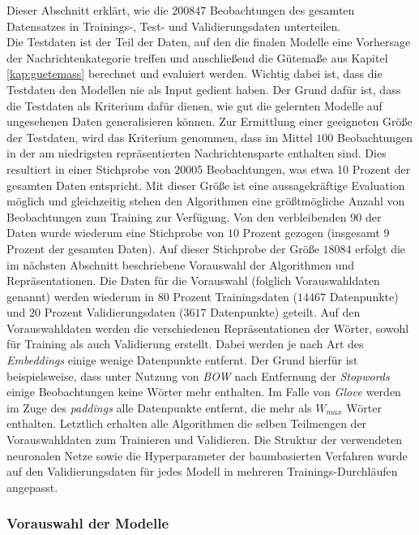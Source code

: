 \documentclass[a4paper,11pt]{article}
\begin{document}
Dieser Abschnitt erklärt, wie die $200847$ Beobachtungen des gesamten Datensatzes in Trainings-, Test- und Validierungsdaten unterteilen.\\
Die Testdaten ist der Teil der Daten, auf den die finalen Modelle eine Vorhersage der Nachrichtenkategorie treffen und anschließend die Gütemaße aus Kapitel \ref{kap:guetemass} berechnet und evaluiert werden. Wichtig dabei ist, dass die Testdaten den Modellen nie als Input gedient haben. Der Grund dafür ist, dass die Testdaten als Kriterium dafür dienen, wie gut die gelernten Modelle auf ungesehenen Daten generalisieren können. Zur Ermittlung einer geeigneten Größe der Testdaten, wird das Kriterium genommen, dass im Mittel $100$ Beobachtungen in der am niedrigsten repräsentierten Nachrichtensparte enthalten sind. Dies resultiert in einer Stichprobe von $20005$ Beobachtungen, was etwa 10 Prozent der gesamten Daten entspricht. Mit dieser Größe ist eine aussagekräftige Evaluation möglich und gleichzeitig stehen den Algorithmen eine größtmögliche Anzahl von Beobachtungen zum Training zur Verfügung. Von den verbleibenden $90$ der Daten wurde wiederum eine Stichprobe von $10$ Prozent gezogen (insgesamt $9$ Prozent der gesamten Daten). Auf dieser Stichprobe der Größe $18084$ erfolgt die im nächsten Abschnitt beschriebene Vorauswahl der Algorithmen und Repräsentationen. Die Daten für die Vorauswahl (folglich Vorauswahldaten genannt) werden wiederum in $80$ Prozent Trainingsdaten ($14467$ Datenpunkte) und $20$ Prozent  Validierungsdaten ($3617$ Datenpunkte) geteilt. Auf den Vorauswahldaten werden die verschiedenen Repräsentationen der Wörter, sowohl für Training als auch Validierung erstellt. Dabei werden je nach Art des \textit{Embeddings} einige wenige Datenpunkte entfernt. Der Grund hierfür ist beispielsweise, dass  unter Nutzung von \textit{BOW} nach Entfernung der \textit{Stopwords} einige Beobachtungen keine Wörter mehr enthalten. Im Falle von \textit{Glove} werden im Zuge des \textit{paddings} alle Datenpunkte entfernt, die mehr als $W_{max}$ Wörter enthalten.
Letztlich erhalten alle Algorithmen die selben Teilmengen der Vorauswahldaten zum Trainieren und Validieren. Die Struktur der verwendeten neuronalen Netze sowie die Hyperparameter der baumbasierten Verfahren wurde auf den Validierungsdaten für jedes Modell in mehreren Trainings-Durchläufen angepasst.

\subsubsection{Vorauswahl der Modelle}\label{kap:preselection}
\end{document}
